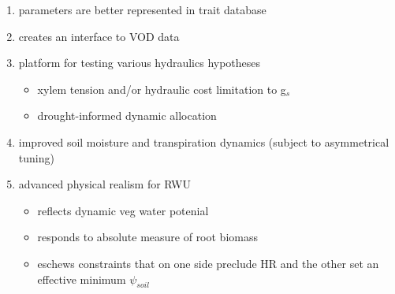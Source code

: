 \documentclass[draft,linenumbers]{agujournal}
\begin{document}
\begin{enumerate}
    \item parameters are better represented in trait database
    \item creates an interface to VOD data
    \item platform for testing various hydraulics hypotheses
    \begin{itemize}
        \item xylem tension and/or hydraulic cost limitation to g$_s$
        \item drought-informed dynamic allocation
    \end{itemize}
     \item improved soil moisture and transpiration dynamics (subject to asymmetrical tuning)
     \item advanced physical realism for RWU
     \begin{itemize}
         \item reflects dynamic veg water potenial
         \item responds to absolute measure of root biomass
         \item eschews constraints that on one side preclude HR and the other set an effective minimum $\psi_{soil}$
     \end{itemize}
\end{enumerate}
\end{document}
